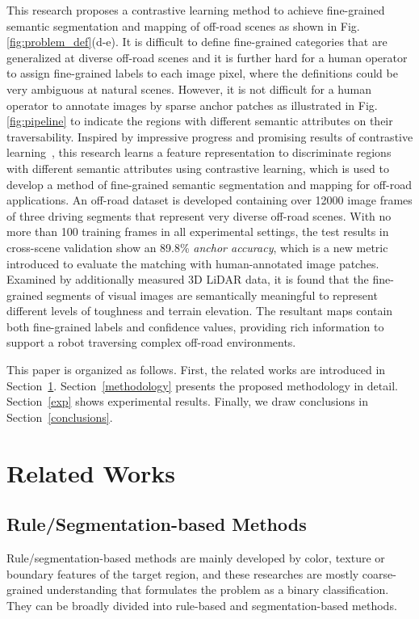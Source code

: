 \documentclass[letterpaper, 10 pt, conference]{ieeeconf}  %
\begin{document}
	This research proposes a contrastive learning method to achieve fine-grained semantic segmentation and mapping of off-road scenes as shown in Fig. \ref{fig:problem_def}(d-e).
	It is difficult to define fine-grained categories that are generalized at diverse off-road scenes and it is further hard for a human operator to assign fine-grained labels to each image pixel, where the definitions could be very ambiguous at natural scenes. However, it is not difficult for a human operator to annotate images by sparse anchor patches as illustrated in Fig. \ref{fig:pipeline} to indicate the regions with different semantic attributes on their traversability. Inspired by impressive progress and promising results of contrastive learning~\cite{oord2018CPC}\cite{chen2020simple}\cite{he2020momentum}, this research learns a feature representation to discriminate regions with different semantic attributes using contrastive learning, which is used to develop a method of fine-grained semantic segmentation and mapping for off-road applications.
	An off-road dataset is developed containing over 12000 image frames of three driving segments that represent very diverse off-road scenes.
	With no more than 100 training frames in all experimental settings, the test results in cross-scene validation show an 89.8\% \textit{anchor accuracy}, which is a new metric introduced to evaluate the matching with human-annotated image patches. 
	Examined by additionally measured 3D LiDAR data, 
	it is found that the fine-grained segments of visual images are semantically meaningful to represent different levels of toughness and terrain elevation.
	The resultant maps contain both fine-grained labels and confidence values, providing rich information to support a robot traversing complex off-road environments.
	
	
	This paper is organized as follows. First, the related works
	are introduced in Section~\ref{related_works}. Section~\ref{methodology} presents the proposed methodology in detail. Section~\ref{exp} shows experimental results. Finally, we draw conclusions in Section~\ref{conclusions}.
	
	\section{Related Works} \label{related_works}
	\subsection{Rule/Segmentation-based Methods}
	Rule/segmentation-based methods are mainly developed by color, texture or boundary features of the target region, and these researches are mostly coarse-grained understanding that formulates the problem as a binary classification. They can be broadly divided into rule-based and segmentation-based methods.
	
\end{document}
